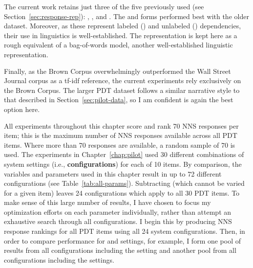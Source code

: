 The current work retains just three of the five  previously used (see Section~\ref{sec:response-rep}): , , and . The  and  forms performed best with the older dataset. Moreover, as these represent labeled () and unlabeled () dependencies, their use in linguistics is well-established. The  representation is kept here as a rough equivalent of a bag-of-words model, another well-established linguistic representation.

Finally, as the Brown Corpus overwhelmingly outperformed the Wall Street Journal corpus as a tf-idf reference, the current experiments rely exclusively on the Brown Corpus. The larger PDT dataset follows a similar narrative style to that described in Section~\ref{sec:pilot-data}, so I am confident  is again the best option here.

All experiments throughout this chapter score and rank 70 NNS responses per item; this is the maximum number of NNS responses available across all PDT items. Where more than 70 responses are available, a random sample of 70 is used.
The experiments in Chapter~\ref{chap:pilot} used 30 different combinations of system settings (i.e., \textbf{configurations}) for each of 10 items. By comparison, the variables and parameters used in this chapter result in up to 72 different configurations (see Table~\ref{tab:all-params}). Subtracting  (which cannot be varied for a given item) leaves 24 configurations which apply to all 30 PDT items. To make sense of this large number of results, I have chosen to focus my optimization efforts on each parameter individually, rather than attempt an exhaustive search through all configurations. I begin this by producing NNS response rankings for all PDT items using all 24 system configurations. Then, in order to compare performance for  and  settings, for example, I form one pool of results from all configurations including the  setting and another pool from all configurations including the  settings.


